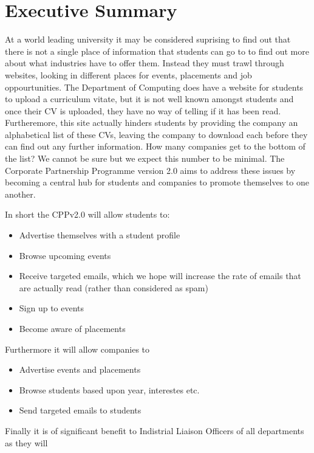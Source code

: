 \section{Executive Summary}
At a world leading university it may be considered suprising to find out that there is not a single place of information that students can go to to find out more about what industries have to offer them. Instead they must trawl through websites, looking in different places for events, placements and job oppourtunities.
The Department of Computing does have a website for students to upload a curriculum vitate, but it is not well known amongst students and once their CV is uploaded, they have no way of telling if it has been read.
Furtheremore, this site actually hinders students by providing the company an alphabetical list of these CVs, leaving the company to download each before they can find out any further information. How many companies get to the bottom of the list? We cannot be sure but we expect this number to be minimal.
The Corporate Partnership Programme version 2.0 aims to address these issues by becoming a central hub for students and companies to promote themselves to one another.

In short the CPPv2.0 will allow students to:

\begin{itemize}
  \item Advertise themselves with a student profile
  \item Browse upcoming events
  \item Receive targeted emails, which we hope will increase the rate of emails that are actually read (rather than considered as spam)
  \item Sign up to events
  \item Become aware of placements
\end{itemize}

Furthermore it will allow companies to

\begin{itemize}
  \item Advertise events and placements
  \item Browse students based upon year, interestes etc.
  \item Send targeted emails to students
\end{itemize}

Finally it is of significant benefit to Indistrial Liaison Officers of all departments as they will

